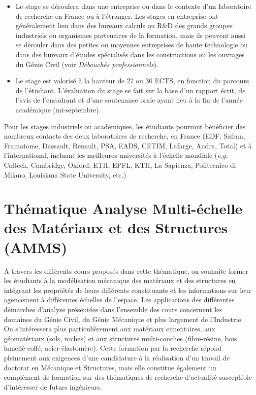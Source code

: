 \documentclass[french,11pt]{article}
\begin{document}
\begin{itemize}
\item Le stage  se déroulera  dans une entreprise ou dans le contexte d'un laboratoire de recherche en France ou à l'étranger. Les stages en entreprise ont généralement lieu dans des bureaux calculs ou R\&D des grands groupes industriels ou organismes partenaires de la formation, mais ils peuvent aussi se dérouler dans des petites ou moyennes entreprises de haute technologie ou dans des bureaux d'études spécialisés dans les constructions ou les ouvrages du Génie Civil (voir \emph{Débouchés professionnels}). 
\item Le stage est valorisé à la hauteur de 27 ou 30 ECTS, en fonction du parcours de l'étudiant. L'évaluation du stage se fait sur la base d'un rapport écrit, de l'avis de l'encadrant et d'une soutenance orale ayant lieu à la fin de l'année académique (mi-septembre).
\end{itemize}
Pour les stages industriels ou académiques, les étudiants pourront bénéficier des nombreux contacts des deux laboratoires de recherche, en France (EDF, Safran, Framatome, Dassault, Renault, PSA, EADS, CETIM, Lafarge, Andra, Total) et à l'international, incluant les meilleures universités à l'échelle mondiale (\emph{e.g.} Caltech, Cambridge, Oxford, ETH, EPFL, KTH, La Sapienza, Politecnico di Milano, Louisiana State University, etc.)
\newpage
\section{Thématique Analyse Multi-échelle des Matériaux et des Structures (AMMS)}
 A travers les différents cours proposés dans cette thématique, on souhaite former les étudiants à la modélisation mécanique des matériaux et des structures en intégrant  les propriétés de leurs différents constituants et les informations sur leur agencement à différentes échelles de l'espace. Les applications des différentes démarches d'analyse présentées dans l'ensemble des cours concernent les domaines du Génie Civil, du Génie Mécanique et plus largement de l'Industrie. On s'intéressera plus particulièrement aux matériaux cimentaires, aux géomatériaux (sols, roches) et aux structures multi-couches (fibre-résine, bois lamellé-collé, acier-élastomère). Cette  formation par la recherche répond pleinement aux exigences d'une candidature à la réalisation d'un travail de doctorat en Mécanique et Structures, mais elle constitue également un complément de formation sur des thématiques de recherche d'actualité susceptible d'intéresser de futurs ingénieurs.
\end{document}
